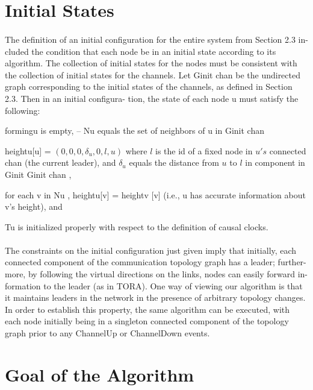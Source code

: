 \section{Initial States}
\paragraph{}The definition of an initial configuration for the entire system from Section 2.3 in- cluded the condition that each node be in an initial state according to its algorithm. The collection of initial states for the nodes must be consistent with the collection of initial states for the channels. Let Ginit chan be the undirected graph corresponding to the initial states of the channels, as defined in Section 2.3. Then in an initial configura- tion, the state of each node u must satisfy the following:
\begin{list}{--}{spacing}
	\item formingu is empty, – Nu equals the set of neighbors of u in Ginit chan
	\item heightu[u] = $(0, 0, 0, \delta _u , 0, l, u)$ where $l$ is the id of a fixed node in $u's$ connected chan (the current leader), and $\delta _u$ equals the distance from $u$ to $l$ in component in Ginit Ginit chan ,
	\item for each v in Nu , heightu[v] = heightv [v] (i.e., u has accurate information about v’s height), and
	\item Tu is initialized properly with respect to the definition of causal clocks.
\end{list}
\paragraph{}The constraints on the initial configuration just given imply that initially, each connected component of the communication topology graph has a leader; further- more, by following the virtual directions on the links, nodes can easily forward in- formation to the leader (as in TORA). One way of viewing our algorithm is that it maintains leaders in the network in the presence of arbitrary topology changes. In order to establish this property, the same algorithm can be executed, with each node initially being in a singleton connected component of the topology graph prior to any ChannelUp or ChannelDown events.
\section{Goal of the Algorithm}
